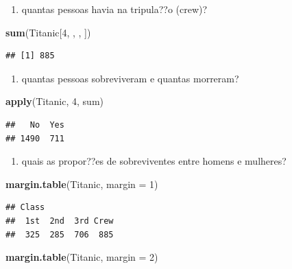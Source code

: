\documentclass[]{book}
\newenvironment{Shaded}{\begin{snugshade}}{\end{snugshade}}
\newcommand{\DataTypeTok}[1]{\textcolor[rgb]{0.13,0.29,0.53}{#1}}
\newcommand{\DecValTok}[1]{\textcolor[rgb]{0.00,0.00,0.81}{#1}}
\newcommand{\KeywordTok}[1]{\textcolor[rgb]{0.13,0.29,0.53}{\textbf{#1}}}
\newcommand{\NormalTok}[1]{#1}
\providecommand{\tightlist}{%
  \setlength{\itemsep}{0pt}\setlength{\parskip}{0pt}}
\begin{document}
\begin{enumerate}
\def\labelenumi{\arabic{enumi}.}
\setcounter{enumi}{1}
\tightlist
\item
  quantas pessoas havia na tripula??o (crew)?
\end{enumerate}

\begin{Shaded}
\begin{Highlighting}[]
\KeywordTok{sum}\NormalTok{(Titanic[}\DecValTok{4}\NormalTok{, , , ])}
\end{Highlighting}
\end{Shaded}

\begin{verbatim}
## [1] 885
\end{verbatim}

\begin{enumerate}
\def\labelenumi{\arabic{enumi}.}
\setcounter{enumi}{2}
\tightlist
\item
  quantas pessoas sobreviveram e quantas morreram?
\end{enumerate}

\begin{Shaded}
\begin{Highlighting}[]
\KeywordTok{apply}\NormalTok{(Titanic, }\DecValTok{4}\NormalTok{, sum)}
\end{Highlighting}
\end{Shaded}

\begin{verbatim}
##   No  Yes 
## 1490  711
\end{verbatim}

\begin{enumerate}
\def\labelenumi{\arabic{enumi}.}
\setcounter{enumi}{3}
\tightlist
\item
  quais as propor??es de sobreviventes entre homens e mulheres?
\end{enumerate}

\begin{Shaded}
\begin{Highlighting}[]
\KeywordTok{margin.table}\NormalTok{(Titanic, }\DataTypeTok{margin =} \DecValTok{1}\NormalTok{)}
\end{Highlighting}
\end{Shaded}

\begin{verbatim}
## Class
##  1st  2nd  3rd Crew 
##  325  285  706  885
\end{verbatim}

\begin{Shaded}
\begin{Highlighting}[]
\KeywordTok{margin.table}\NormalTok{(Titanic, }\DataTypeTok{margin =} \DecValTok{2}\NormalTok{)}
\end{Highlighting}
\end{Shaded}
\end{document}
